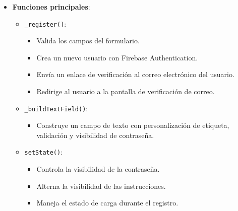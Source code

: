\documentclass{article}
\begin{document}
\begin{flushleft}
\begin{itemize}
    \item \textbf{Funciones principales}:
    \begin{itemize}
        \item \texttt{\_register()}:
        \begin{itemize}
            \item Valida los campos del formulario.
            \item Crea un nuevo usuario con Firebase Authentication.
            \item Env\'ia un enlace de verificaci\'on al correo electr\'onico del usuario.
            \item Redirige al usuario a la pantalla de verificaci\'on de correo.
        \end{itemize}
        \item \texttt{\_buildTextField()}:
        \begin{itemize}
            \item Construye un campo de texto con personalizaci\'on de etiqueta, validaci\'on y visibilidad de contrase\~na.
        \end{itemize}
        \item \texttt{setState()}:
        \begin{itemize}
            \item Controla la visibilidad de la contrase\~na.
            \item Alterna la visibilidad de las instrucciones.
            \item Maneja el estado de carga durante el registro.
        \end{itemize}
    \end{itemize}
\end{itemize}


\end{flushleft}
\end{document}
